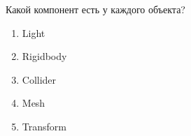 
Какой компонент есть у каждого объекта?

\begin{enumerate}
    \item Light
    \item Rigidbody
    \item Collider
    \item Mesh
    \item Transform
\end{enumerate}

